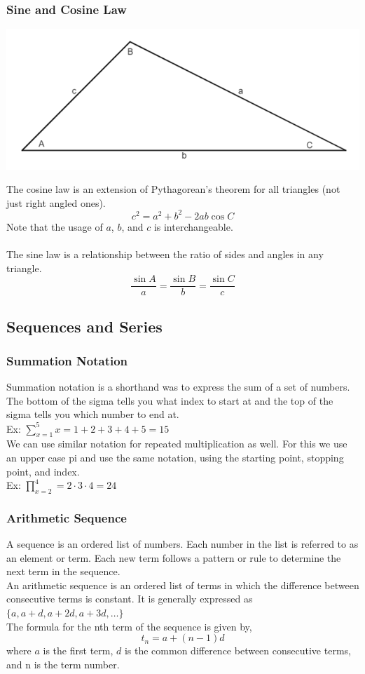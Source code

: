 \documentclass[11pt, fleqn]{article}
\begin{document}
\subsubsection{Sine and Cosine Law}
\centerline{\includegraphics[scale=0.7]{FundamentalsPictures/SineLawTriangle.png}}
The cosine law is an extension of Pythagorean's theorem for all triangles (not just right angled ones).
$$c^2=a^2+b^2-2ab\cos C$$
Note that the usage of $a$, $b$, and $c$ is interchangeable.\\
\\
The sine law is a relationship between the ratio of sides and angles in any triangle.
$$\frac{\sin A}{a}=\frac{\sin B}{b}=\frac{\sin C}{c}$$









\subsection{Sequences and Series}

\subsubsection{Summation Notation}
Summation notation is a shorthand was to express the sum of a set of numbers. The bottom of the sigma tells you what index to start at and the top of the sigma tells you which number to end at.\\
Ex: $\sum \limits_{x=1}^5 x=1+2+3+4+5=15$\\
We can use similar notation for repeated multiplication as well. For this we use an upper case pi and use the same notation, using the starting point, stopping point, and index.\\
Ex: $\prod \limits_{x=2}^4=2\cdot 3\cdot 4=24$

\subsubsection{Arithmetic Sequence}
A sequence is an ordered list of numbers. Each number in the list is referred to as an element or term. Each new term follows a pattern or rule to determine the next term in the sequence.\\
An arithmetic sequence is an ordered list of terms in which the difference between consecutive terms is constant. It is generally expressed as $\{a,a+d,a+2d,a+3d,\ldots\}$\\ The formula for the nth term of the sequence is given by,
$$t_n=a+(n-1)d$$
where $a$ is the first term, $d$ is the common difference between consecutive terms, and n is the term number.
\end{document}
